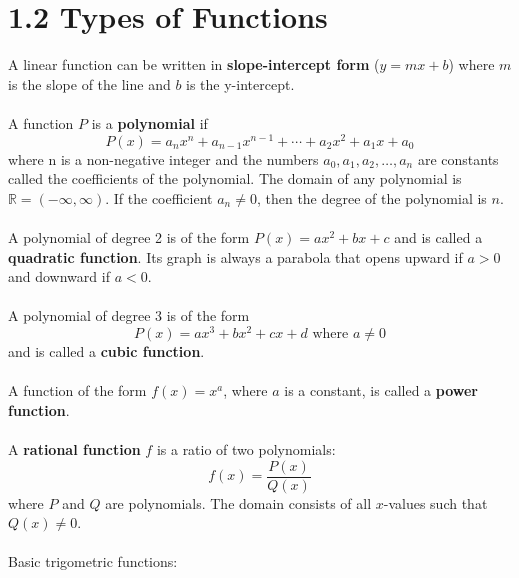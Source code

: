 %
%

\section*{1.2 Types of Functions}

A linear function can be written in \textbf{slope-intercept form} (\(y=mx+b\)) where \(m\) is the slope of the line and \(b\) is the y-intercept.
\\\\
A function \(P\) is a \textbf{polynomial} if 
$$P(x)=a_n{x}^n+a_{n-1}x^{n-1}+ \cdots +a_2x^2+a_1x+a_0$$
where n is a non-negative integer and the numbers \(a_0, a_1, a_2, \ldots ,a_n\) are constants called the coefficients of the polynomial. The domain of any polynomial is \(\mathbb{R} = (-\infty, \infty)\). If the coefficient \(a_n \neq 0\), then the degree of the polynomial is \(n\).
\\\\
A polynomial of degree 2 is of the form \(P(x)=ax^2+bx+c\) and is called a \textbf{quadratic function}. Its graph is always a parabola that opens upward if \(a > 0\) and downward if \(a < 0\).
\\\\
A polynomial of degree 3 is of the form 
\[ P(x)=ax^3+bx^2+cx+d \text{ where } a \neq 0 \]
and is called a \textbf{cubic function}.
\\\\
A function of the form \(f(x) = x^a\), where \(a\) is a constant, is called a \textbf{power function}.
\\\\
A \textbf{rational function} \(f\) is a ratio of two polynomials:
\[ f(x)=\frac{P(x)}{Q(x)} \]
where \(P\) and \(Q\) are polynomials. The domain consists of all \(x\)-values such that \( Q(x) \neq 0 \).
\\\\
Basic trigometric functions:\\

